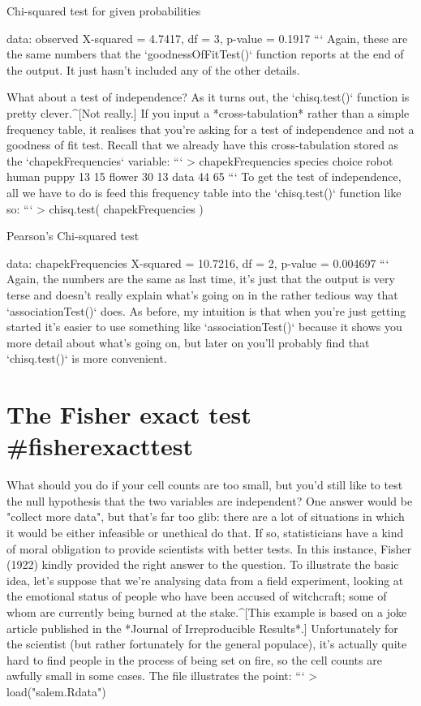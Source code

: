 	Chi-squared test for given probabilities

data:  observed
X-squared = 4.7417, df = 3, p-value = 0.1917
``` 
Again, these are the same numbers that the `goodnessOfFitTest()` function reports at the end of the output. It just hasn't included any of the other details.

What about a test of independence? As it turns out, the `chisq.test()` function is pretty clever.^[Not really.] If you input a *cross-tabulation* rather than a simple frequency table, it realises that you're asking for a test of independence and not a goodness of fit test. Recall that we already have this cross-tabulation stored as the `chapekFrequencies` variable:
```
> chapekFrequencies
        species
choice   robot human
  puppy     13    15
  flower    30    13
  data      44    65
```
To get the test of independence, all we have to do is feed this frequency table into the `chisq.test()` function like so:
```
> chisq.test( chapekFrequencies )

	Pearson's Chi-squared test

data:  chapekFrequencies
X-squared = 10.7216, df = 2, p-value = 0.004697
```
Again, the numbers are the same as last time, it's just that the output is very terse and doesn't really explain what's going on in the rather tedious way that `associationTest()` does. As before, my intuition is that when you're just getting started it's easier to use something like `associationTest()` because it shows you more detail about what's going on, but later on you'll probably find that `chisq.test()` is more convenient.



\section{The Fisher exact test {#fisherexacttest}}

What should you do if your cell counts are too small, but you'd still like to test the null hypothesis that the two variables are independent? One answer would be "collect more data", but that's far too glib: there are a lot of situations in which it would be either infeasible or unethical do that. If so, statisticians have a kind of moral obligation to provide scientists with better tests. In this instance, Fisher (1922) kindly provided the right answer to the question. To illustrate the basic idea, let's suppose that we're analysing data from a field experiment, looking at the emotional status of people who have been accused of witchcraft; some of whom are currently being burned at the stake.^[This example is based on a joke article published in the *Journal of Irreproducible Results*.] Unfortunately for the scientist (but rather fortunately for the general populace), it's actually quite hard to find people in the process of being set on fire, so the cell counts are awfully small in some cases. The  file illustrates the point:
```
> load("salem.Rdata")

